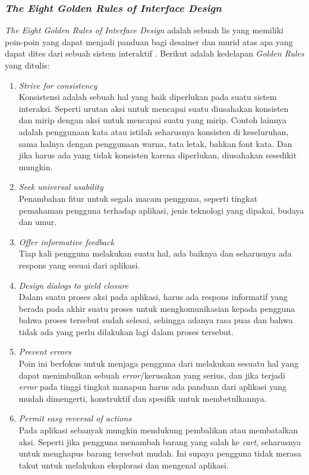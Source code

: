 \documentclass[a4paper]{article}
\newcommand{\subsubbab}[1]{%
    \subsubsection{#1}%
}
\begin{document}
\subsubbab{\textit{The Eight Golden Rules of Interface Design}}
\textit{The Eight Golden Rules of Interface Design} adalah sebuah lis yang memiliki poin-poin yang dapat menjadi panduan bagi desainer dan murid atas apa yang dapat dites dari sebuah sistem interaktif \autocite[95-97]{Shneiderman_Plaisant_Cohen_Jacobs_Elmqvist_2018_5_factors}. Berikut adalah kedelapan \textit{Golden Rules} yang ditulis:
\begin{enumerate}
    \item \textit{Strive for consistency}\\
    Konsistensi adalah sebuah hal yang baik diperlukan pada suatu sistem interaksi. Seperti urutan aksi untuk mencapai suatu diusahakan konsisten dan mirip dengan aksi untuk mencapai suatu yang mirip. Contoh lainnya adalah penggunaan kata atau istilah seharusnya konsisten di keseluruhan, sama halnya dengan penggunaan warna, tata letak, bahkan font kata. Dan jika harus ada yang tidak konsisten karena diperlukan, diusahakan sesedikit mungkin.
    \item \textit{Seek universal usability}\\
    Penambahan fitur untuk segala macam pengguna, seperti tingkat pemahaman pengguna terhadap aplikasi, jenis teknologi yang dipakai, budaya dan umur.
    \item \textit{Offer informative feedback}\\
    Tiap kali pengguna melakukan suatu hal, ada baiknya dan seharusnya ada respons yang sesuai dari aplikasi.
    \item \textit{Design dialogs to yield closure}\\
    Dalam suatu proses aksi pada aplikasi, harus ada respons informatif yang berada pada akhir suatu proses untuk mengkomunikasian kepada pengguna bahwa proses tersebut sudah selesai, sehingga adanya rasa puas dan bahwa tidak ada yang perlu dilakukan lagi dalam proses tersebut.
    \item \textit{Prevent errors}\\
    Poin ini berfokus untuk menjaga pengguna dari melakukan sesuatu hal yang dapat menimbulkan sebuah \textit{error}/kerusakan yang serius, dan jika terjadi \textit{error} pada tinggi tingkat manapun harus ada panduan dari aplikasi yang mudah dimengerti, konstruktif dan spesifik untuk membetulkannya.
    \item \textit{Permit easy reversal of actions}\\
    Pada aplikasi sebanyak mungkin mendukung pembalikan atau membatalkan aksi. Seperti jika pengguna menambah barang yang salah ke \textit{cart}, seharusnya untuk menghapus barang tersebut mudah. Ini supaya pengguna tidak merasa takut untuk melakukan eksplorasi dan mengenal aplikasi.

\end{enumerate}
\end{document}
